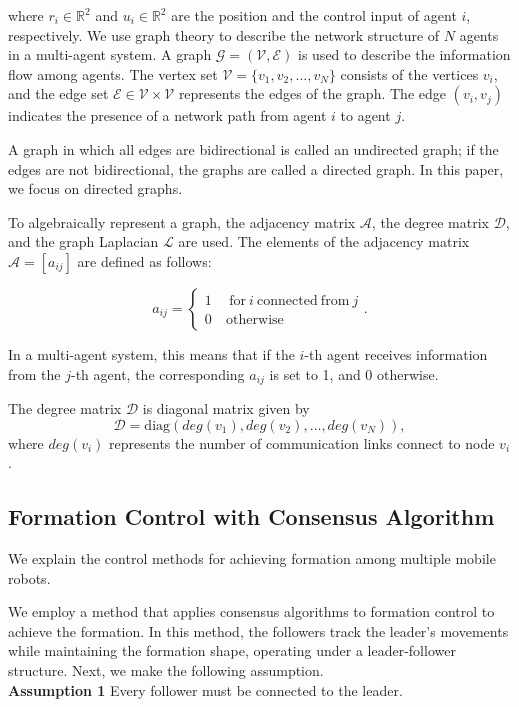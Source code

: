 \documentclass[a4paper,fleqn,10pt,twocolumn]{SICE_ISCS}
\begin{document}
\noindent where $r_i \in {\mathbb{R}}^2$ and $u_i \in {\mathbb{R}}^2$ are the position and the control input of agent $i$, respectively. We use graph theory to describe the network structure of $N$ agents in a multi-agent system. A graph $ {\mathcal{G}} = (\mathcal{V}, \mathcal{E})$ is used to describe the information flow among agents. The vertex set ${\mathcal{V}} =\{v_1, v_2, \ldots, v_N\}$ consists of the vertices $v_i$, and the edge set ${{\mathcal{E}}\in {\mathcal{V}}\times{\mathcal{V}}}$ represents the edges of the graph. The edge $(v_i,v_j)$ indicates the presence of a network path from agent $i$ to agent $j$.

A graph in which all edges are bidirectional is called an undirected graph; if the edges are not bidirectional, the graphs are called a directed graph. In this paper, we focus on directed graphs.

To algebraically represent a graph, the adjacency matrix $\mathcal{A}$, the degree matrix $\mathcal{D}$, and the graph Laplacian $\mathcal{L}$ are used. The elements of the adjacency matrix ${\mathcal{A}} = [a_{ij}]$ are defined as follows:

\begin{equation}
	a_{ij}=
	\begin{cases}
		1 &\ \ {\mathrm{for}}\ i\ \mathrm{connected\ from}\ j\\
		0 &	\ \mathrm{otherwise}
	\end{cases}.
\end{equation}

In a multi-agent system, this means that if the $i$-th agent receives information from the $j$-th agent, the corresponding $a_{ij}$ is set to 1, and 0 otherwise.

The degree matrix $\mathcal{D}$ is diagonal matrix given by \begin{equation} {\mathcal{D}} = {\mathrm{diag}}(deg(v_1), deg(v_2), \dots, deg(v_N)), \end{equation}
where $deg(v_i)$ represents the number of communication links connect to node $v_i$.
\subsection{Formation Control with Consensus Algorithm}
We explain the control methods for achieving formation among multiple mobile robots.

We employ a method that applies consensus algorithms to formation control to achieve the formation{\cite{栗城モデル}}. In this method, the followers track the leader's movements while maintaining the formation shape, operating under a leader-follower structure. 
Next, we make the following assumption.\\
\textbf{Assumption 1} Every follower must be connected to the leader.
\end{document}
